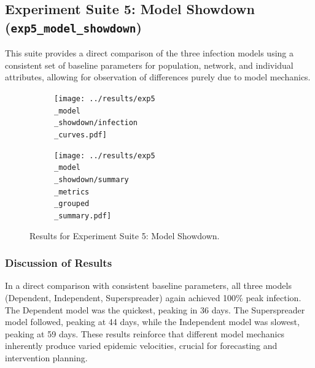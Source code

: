 \documentclass[12pt]{article}
\begin{document}
\subsection[Exp Suite 5: Model Showdown]{Experiment Suite 5: Model Showdown (\texttt{exp5\_mod\-el\_show\-down})}
This suite provides a direct comparison of the three infection models using a consistent set of baseline parameters for population, network, and individual attributes, allowing for observation of differences purely due to model mechanics. \begin{figure}[htbp!] \centering \begin{subfigure}{.48\textwidth} \centering \texttt{[image: ../results/exp5\\\_model\\\_showdown/infection\\\_curves.pdf]} 
 \label{fig:exp5_curves} \end{subfigure} \hfill \begin{subfigure}{.48\textwidth} \centering \texttt{[image: ../results/exp5\\\_model\\\_showdown/summary\\\_metrics\\\_grouped\\\_summary.pdf]} 
 \label{fig:exp5_summary} \end{subfigure} \caption[Exp Suite 5 Results]{Results for Experiment Suite 5: Model Showdown.} \label{fig:exp5_results} \end{figure}
\begin{table}[H]
\centering
\caption{Summary Metrics for Experiment Suite 5: Model Showdown}
\label{tab:exp5_metrics}
\end{table}

\subsubsection*{Discussion of Results}
In a direct comparison with consistent baseline parameters, all three models (Dependent, Independent, Superspreader) again achieved 100\% peak infection. The Dependent model was the quickest, peaking in 36 days. The Superspreader model followed, peaking at 44 days, while the Independent model was slowest, peaking at 59 days. These results reinforce that different model mechanics inherently produce varied epidemic velocities, crucial for forecasting and intervention planning.
\end{document}
